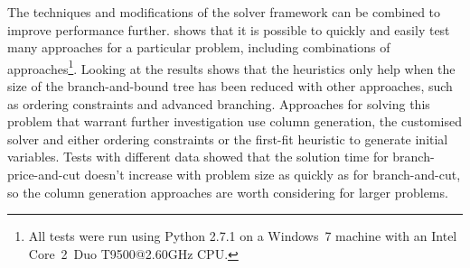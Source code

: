 The techniques and modifications of the solver framework can be combined to improve performance further.
 shows that it is possible to quickly and easily test many approaches for a particular problem, including combinations of approaches\footnote{All tests were run using Python 2.7.1 on a Windows~7 machine with an Intel Core~2~Duo T9500@2.60GHz CPU.}.
Looking at the results shows that the heuristics only help when the size of the branch-and-bound tree has been reduced with other approaches, such as ordering constraints and advanced branching.
Approaches for solving this problem that warrant further investigation use column generation, the customised solver and either ordering constraints or the first-fit heuristic to generate initial variables.
Tests with different data showed that the solution time for branch-price-and-cut doesn't increase with problem size as quickly as for branch-and-cut, so the column generation approaches are worth considering for larger problems.
